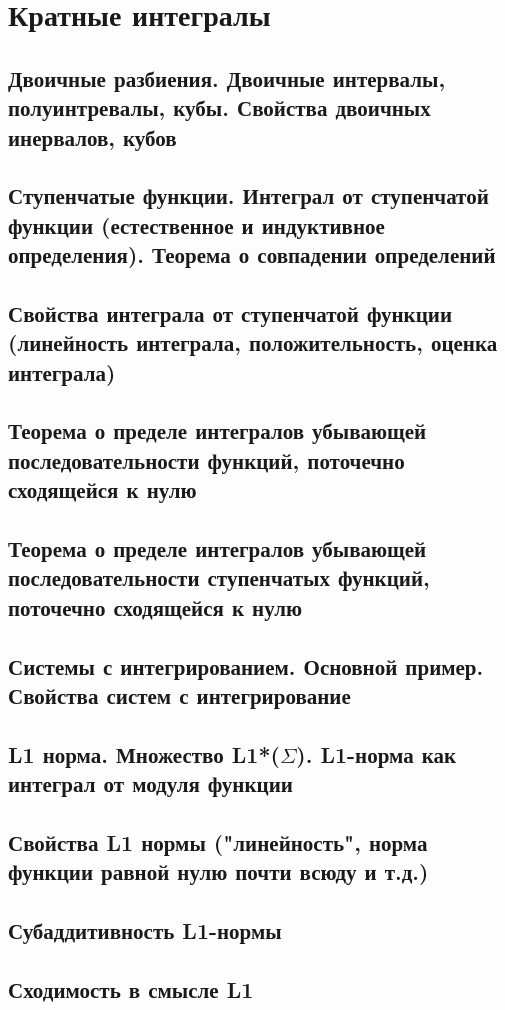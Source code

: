 \documentclass[a4paper]{article}
\theoremstyle{definition}
\theoremstyle{remark}
\begin{document}
    \section{Кратные интегралы}
    \subsection{ Двоичные разбиения. Двоичные интервалы, полуинтревалы, кубы. Свойства двоичных инервалов, кубов}
    \subsection{ Ступенчатые функции. Интеграл от ступенчатой функции (естественное и индуктивное определения). Теорема о совпадении определений}
    \subsection{ Свойства интеграла от ступенчатой функции (линейность интеграла, положительность, оценка интеграла)}
    \subsection{ Теорема о пределе интегралов убывающей последовательности функций, поточечно сходящейся к нулю}
    \subsection{ Теорема о пределе интегралов убывающей последовательности ступенчатых функций, поточечно сходящейся к нулю}
    \subsection{ Системы с интегрированием. Основной пример. Свойства систем с интегрирование}
    \subsection{ L1 норма. Множество L1*($\Sigma$). L1-норма как интеграл от модуля функции}
    \subsection{ Свойства L1 нормы ("линейность", норма функции равной нулю почти всюду и т.д.)}
    \subsection{ Субаддитивность L1-нормы}
    \subsection{ Сходимость в смысле L1}
\end{document}
